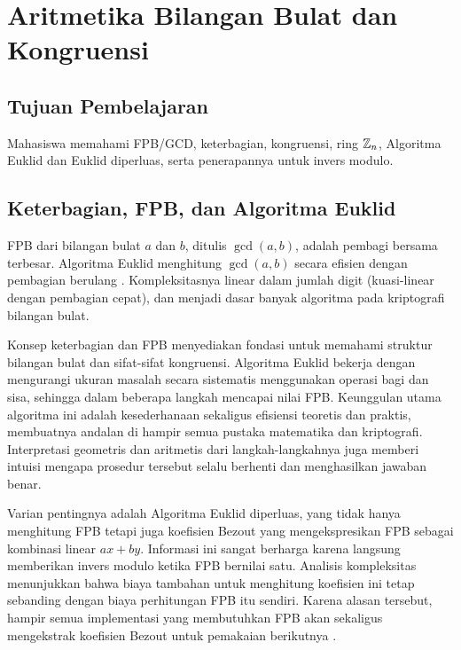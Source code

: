 \documentclass[../main.tex]{subfiles}
\begin{document}
\chapter{Aritmetika Bilangan Bulat dan Kongruensi}

\section{Tujuan Pembelajaran}
Mahasiswa memahami FPB/GCD, keterbagian, kongruensi, ring \(\mathbb{Z}_n\), Algoritma Euklid dan Euklid diperluas, serta penerapannya untuk invers modulo.

\section{Keterbagian, FPB, dan Algoritma Euklid}
\begin{definition}
FPB dari bilangan bulat \(a\) dan \(b\), ditulis \(\gcd(a,b)\), adalah pembagi bersama terbesar. Algoritma Euklid menghitung \(\gcd(a,b)\) secara efisien dengan pembagian berulang \citep{rosen}. Kompleksitasnya linear dalam jumlah digit (kuasi-linear dengan pembagian cepat), dan menjadi dasar banyak algoritma pada kriptografi bilangan bulat.
\end{definition}

Konsep keterbagian dan FPB menyediakan fondasi untuk memahami struktur bilangan bulat dan sifat-sifat kongruensi. Algoritma Euklid bekerja dengan mengurangi ukuran masalah secara sistematis menggunakan operasi bagi dan sisa, sehingga dalam beberapa langkah mencapai nilai FPB. Keunggulan utama algoritma ini adalah kesederhanaan sekaligus efisiensi teoretis dan praktis, membuatnya andalan di hampir semua pustaka matematika dan kriptografi. Interpretasi geometris dan aritmetis dari langkah-langkahnya juga memberi intuisi mengapa prosedur tersebut selalu berhenti dan menghasilkan jawaban benar.

Varian pentingnya adalah Algoritma Euklid diperluas, yang tidak hanya menghitung FPB tetapi juga koefisien Bezout yang mengekspresikan FPB sebagai kombinasi linear \(ax+by\). Informasi ini sangat berharga karena langsung memberikan invers modulo ketika FPB bernilai satu. Analisis kompleksitas menunjukkan bahwa biaya tambahan untuk menghitung koefisien ini tetap sebanding dengan biaya perhitungan FPB itu sendiri. Karena alasan tersebut, hampir semua implementasi yang membutuhkan FPB akan sekaligus mengekstrak koefisien Bezout untuk pemakaian berikutnya \citep{hoffstein}.
\end{document}

